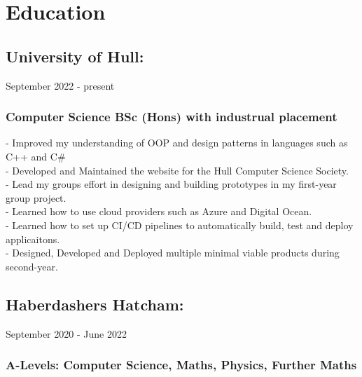 \section{Education}

\subsection{University of Hull:} September 2022 - present \\

\subsubsection{Computer Science BSc (Hons) with industrual placement}

-\: Improved my understanding of OOP and design patterns in languages such as C++ and C\#\\
-\: Developed and Maintained the website for the Hull Computer Science Society. \\
-\: Lead my groups effort in designing and building prototypes in my first-year group project. \\ 
-\: Learned how to use cloud providers such as Azure and Digital Ocean. \\
-\: Learned how to set up CI/CD pipelines to automatically build, test and deploy applicaitons. \\
-\: Designed, Developed and Deployed multiple minimal viable products during second-year. \\

\vspace{10pt}
\subsection{Haberdashers Hatcham:} September 2020 - June 2022 \\ 

\subsubsection{A-Levels: Computer Science, Maths, Physics, Further Maths}
